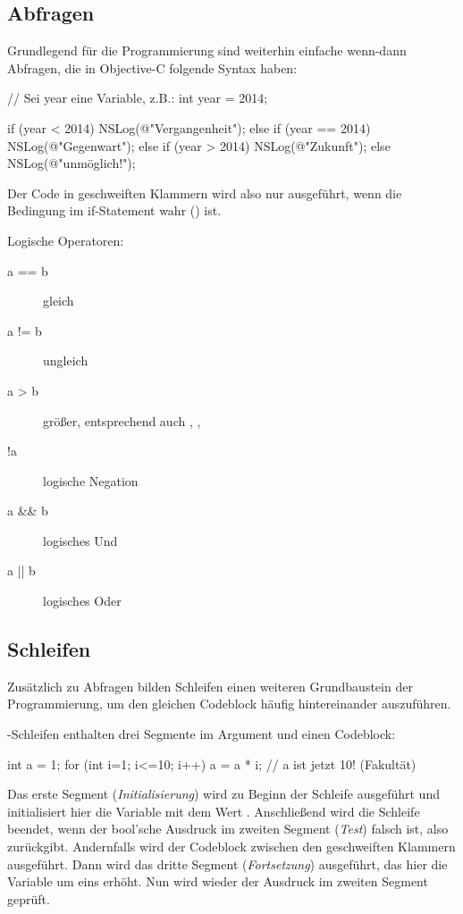 \documentclass[parskip=half, final]{scrreprt}
\begin{document}
\subsection{Abfragen}

Grundlegend für die Programmierung sind weiterhin einfache wenn-dann Abfragen, die in Objective-C folgende Syntax haben:
\begin{objclst}
// Sei year eine Variable, z.B.:
int year = 2014;

if (year < 2014) {
    NSLog(@"Vergangenheit");
} else if (year == 2014) {
    NSLog(@"Gegenwart");
} else if (year > 2014) {
    NSLog(@"Zukunft");
} else {
    NSLog(@"unmöglich!");
}
\end{objclst}
Der Code in geschweiften Klammern wird also nur ausgeführt, wenn die Bedingung im if-Statement wahr () ist.

Logische Operatoren:
\begin{description}
\item[a == b] gleich
\item[a != b] ungleich
\item[a > b] größer, entsprechend auch \objc{>=}, \objc{<}, \objc{<=}
\item[!a] logische Negation
\item[a \&\& b] logisches Und
\item[a || b] logisches Oder
\end{description}

\subsection{Schleifen}

Zusätzlich zu Abfragen bilden Schleifen einen weiteren Grundbaustein der Programmierung, um den gleichen Codeblock häufig hintereinander auszuführen.

-Schleifen enthalten drei Segmente im Argument und einen Codeblock:

\begin{objclst}
int a = 1;
for (int i=1; i<=10; i++) {
    a = a * i;
}
// a ist jetzt 10! (Fakultät)
\end{objclst}

Das erste Segment  (\emph{Initialisierung}) wird zu Beginn der Schleife ausgeführt und initialisiert hier die Variable  mit dem Wert . Anschließend wird die Schleife beendet, wenn der bool'sche Ausdruck im zweiten Segment (\emph{Test}) falsch ist, also  zurückgibt. Andernfalls wird der Codeblock zwischen den geschweiften Klammern ausgeführt. Dann wird das dritte Segment (\emph{Fortsetzung}) ausgeführt, das hier die Variable  um eins erhöht. Nun wird wieder der Ausdruck im zweiten Segment geprüft.
\end{document}
